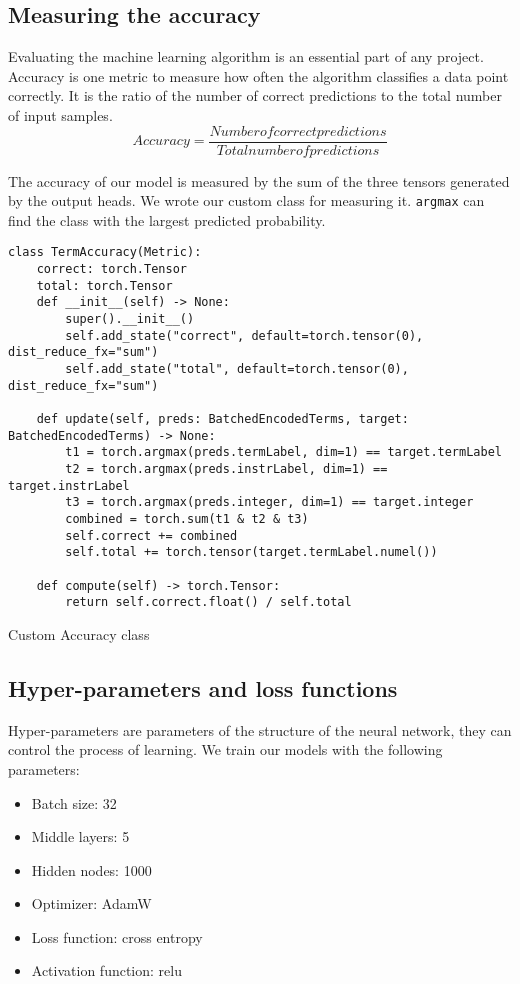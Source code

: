\subsection{Measuring the accuracy}
\label{sec:termacc}
Evaluating the machine learning algorithm is an essential part of any project. Accuracy is one metric to measure how often the algorithm classifies a data point correctly. It is the ratio of the number of correct predictions to the total number of input samples.
\[Accuracy=\frac{Number of correct predictions}{Total number of predictions}\]

The accuracy of our model is measured by the sum of the three tensors generated by the output heads. We wrote our custom class for measuring it. \texttt{argmax} can find the class with the largest predicted probability.
\begin{listing}[H]
\begin{verbatim}
class TermAccuracy(Metric):
    correct: torch.Tensor
    total: torch.Tensor
    def __init__(self) -> None:
        super().__init__()
        self.add_state("correct", default=torch.tensor(0), dist_reduce_fx="sum")
        self.add_state("total", default=torch.tensor(0), dist_reduce_fx="sum")

    def update(self, preds: BatchedEncodedTerms, target: BatchedEncodedTerms) -> None:
        t1 = torch.argmax(preds.termLabel, dim=1) == target.termLabel
        t2 = torch.argmax(preds.instrLabel, dim=1) == target.instrLabel
        t3 = torch.argmax(preds.integer, dim=1) == target.integer
        combined = torch.sum(t1 & t2 & t3)
        self.correct += combined
        self.total += torch.tensor(target.termLabel.numel())

    def compute(self) -> torch.Tensor:
        return self.correct.float() / self.total
\end{verbatim}
\caption{Custom Accuracy class}
\end{listing}


\subsection{Hyper-parameters and loss functions}
Hyper-parameters are parameters of the structure of the neural network, they can control the process of learning. We train our models with the following parameters:
\begin{itemize}
    \item Batch size: 32
    \item Middle layers: 5
    \item Hidden nodes: 1000
    \item Optimizer: AdamW
    \item Loss function: cross entropy
    \item Activation function: relu
\end{itemize}


